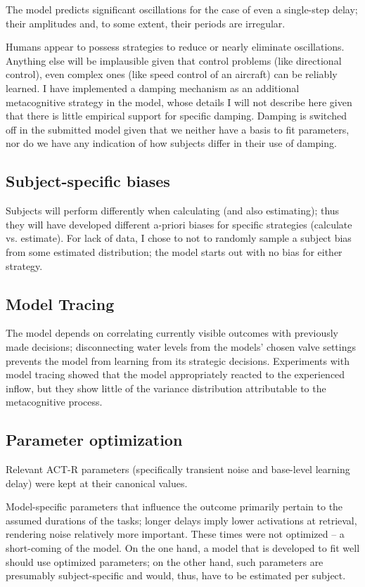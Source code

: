 \documentclass[twocolumn]{article}
\begin{document}
The model predicts significant oscillations for the case of even a single-step delay; their amplitudes and, to some extent, their periods are irregular.

Humans appear to possess strategies to reduce or nearly eliminate oscillations.  Anything else will be implausible given that control problems (like directional control), even complex ones (like speed control of an aircraft) can be reliably learned.  I have implemented a damping mechanism as an additional metacognitive strategy in the model, whose details I will not describe here given that there is little empirical support for specific damping.  Damping is switched off in the submitted model given that we neither have a basis to fit parameters, nor do we have any indication of how subjects differ in their use of damping.

\subsection{Subject-specific biases}

Subjects will perform differently when calculating (and also estimating); thus they will have developed different a-priori biases for specific strategies (calculate vs. estimate).  For lack of data, I chose to not to randomly sample a subject bias from some estimated distribution; the model starts out with no bias for either strategy.


\subsection{Model Tracing}

The model depends on correlating currently visible outcomes with previously made decisions; disconnecting water levels from the models' chosen valve settings prevents the model from learning from its strategic decisions.  Experiments with model tracing showed that the model appropriately reacted to the experienced inflow, but they show little of the variance distribution attributable to the metacognitive process.


\subsection{Parameter  optimization}

Relevant ACT-R parameters (specifically transient noise and base-level learning delay) were kept at their canonical values.

Model-specific parameters that influence the outcome primarily pertain to the assumed durations of the tasks; longer delays imply lower activations at retrieval, rendering noise relatively more important.  These times were not optimized -- a short-coming of the model.  On the one hand, a model that is developed to fit well should use optimized parameters; on the other hand, such parameters are presumably subject-specific and would, thus, have to be estimated per subject.  
\end{document}
